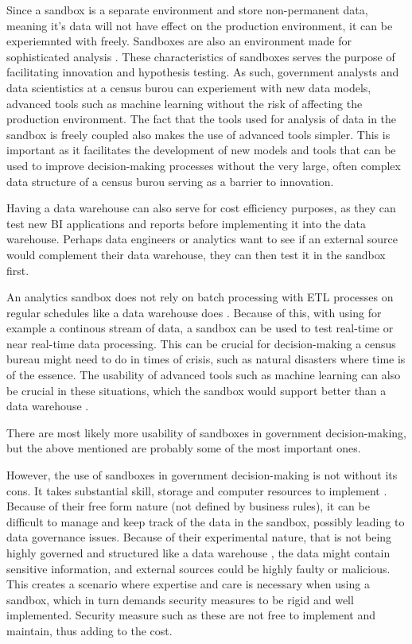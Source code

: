 Since a sandbox is a separate environment and store non-permanent data\cite{l2video}, meaning it's data will not have effect on 
the production environment, it can be experiemnted with freely. Sandboxes are also an environment made for sophisticated analysis \cite{l2video}.
These characteristics of sandboxes serves the purpose of facilitating innovation and hypothesis testing.
As such, government analysts and data scientistics at a census burou can experiement with new data models, advanced tools such as machine learning
without the risk of affecting the production environment. The fact that the tools used for analysis of data in the sandbox is freely coupled \cite{l2video} also makes the use of advanced tools simpler.
This is important as it facilitates the development of new models and tools that can be used to improve decision-making processes
without the very large, often complex data structure of a census burou serving as a barrier to innovation.

Having a data warehouse can also serve for cost efficiency purposes, as they can test new BI applications and reports before implementing it into the data warehouse.
Perhaps data engineers or analytics want to see if an external source would complement their data warehouse, they can then test it in the sandbox first.

An analytics sandbox does not rely on batch processing with ETL processes on regular schedules like a data warehouse does \cite{l2video}.
Because of this, with using for example a continous stream of data, 
a sandbox can be used to test real-time or near real-time data processing.
This can be crucial for decision-making a census bureau might need to do in times of crisis, 
such as natural disasters where time is of the essence. 
The usability of advanced tools such as machine learning can also be crucial in these situations, 
which the sandbox would support better than a data warehouse \cite{l2video}.

There are most likely more usability of sandboxes in government decision-making,
but the above mentioned are probably some of the most important ones.

However, the use of sandboxes in government decision-making is not without its cons. It takes substantial skill, storage and computer resources to implement \cite{l2video}.
Because of their free form nature (not defined by business rules), it can be difficult to manage and keep track of the data in the sandbox, possibly leading to data governance issues.
Because of their experimental nature, that is not being highly governed and structured like a data warehouse \cite{l2video}, the data might contain sensitive information, and external sources could be highly faulty or malicious.
This creates a scenario where expertise and care is necessary when using a sandbox, which in turn demands security measures to be rigid and well implemented. Security measure such as these are not free to implement and maintain, thus adding to the cost.